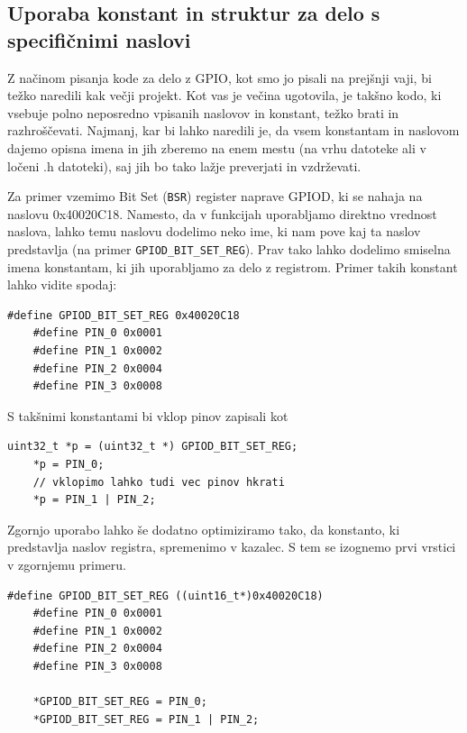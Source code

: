 \documentclass[12pt,letterpaper]{article}
\begin{document}
\subsection*{Uporaba konstant in struktur za delo s specifičnimi naslovi}

Z načinom pisanja kode za delo z GPIO, kot smo jo pisali na prejšnji vaji, bi težko naredili kak večji projekt. Kot vas je večina ugotovila, je takšno kodo, ki vsebuje polno neposredno vpisanih naslovov in konstant, težko brati in razhroščevati. Najmanj, kar bi lahko naredili je, da vsem konstantam in naslovom dajemo opisna imena in jih zberemo na enem mestu (na vrhu datoteke ali v ločeni .h datoteki), saj jih bo tako lažje preverjati in vzdrževati.

Za primer vzemimo Bit Set (\texttt{BSR}) register naprave GPIOD, ki se nahaja na naslovu 0x40020C18. Namesto, da v funkcijah uporabljamo direktno vrednost naslova, lahko temu naslovu dodelimo neko ime, ki nam pove kaj ta naslov predstavlja (na primer \texttt{GPIOD\_BIT\_SET\_REG}). Prav tako lahko dodelimo smiselna imena konstantam, ki jih uporabljamo za delo z registrom. Primer takih konstant lahko vidite spodaj:

\begin{center}
\begin{lstlisting}[style=CStyle]
    #define GPIOD_BIT_SET_REG 0x40020C18
    #define PIN_0 0x0001
    #define PIN_1 0x0002
    #define PIN_2 0x0004
    #define PIN_3 0x0008
\end{lstlisting}
\end{center}

S takšnimi konstantami bi vklop pinov zapisali kot

\begin{center}
\begin{lstlisting}[style=CStyle]
    uint32_t *p = (uint32_t *) GPIOD_BIT_SET_REG;
    *p = PIN_0;
    // vklopimo lahko tudi vec pinov hkrati
    *p = PIN_1 | PIN_2;
\end{lstlisting}
\end{center}

Zgornjo uporabo lahko še dodatno optimiziramo tako, da konstanto, ki predstavlja naslov registra, spremenimo v kazalec. S tem se izognemo prvi vrstici v zgornjemu primeru.

\begin{center}
\begin{lstlisting}[style=CStyle]
    #define GPIOD_BIT_SET_REG ((uint16_t*)0x40020C18)
    #define PIN_0 0x0001
    #define PIN_1 0x0002
    #define PIN_2 0x0004
    #define PIN_3 0x0008
    
    *GPIOD_BIT_SET_REG = PIN_0;
    *GPIOD_BIT_SET_REG = PIN_1 | PIN_2;
\end{lstlisting}
\end{center}
\end{document}
